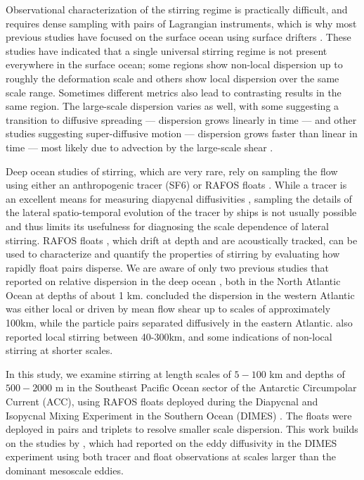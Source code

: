 \documentclass[]{ametsoc}
\begin{document}
Observational characterization of the stirring regime is practically difficult, and requires dense sampling with pairs of Lagrangian instruments, which is why most previous studies have focused on the surface ocean using surface drifters \citep{lacasce2003relative, koszalka2009relative, lumpkin2010surface, poje2014submesoscale, van2015pairwise, sanson2015surface, vera2016, Corrado2017, essink2019can}. These studies have indicated that a single universal stirring regime is not present everywhere in the surface ocean; some regions show non-local dispersion up to roughly the deformation scale and others show local dispersion over the same scale range. Sometimes different metrics also lead to contrasting results in the same region. The large-scale dispersion varies as well, with some suggesting a transition to diffusive spreading --- dispersion grows linearly in time --- \cite[e.g][]{koszalka2009relative} and other studies suggesting super-diffusive motion --- dispersion grows faster than linear in time --- most likely due to advection by the large-scale shear \cite[e.g][]{lacasce2003relative}. 

Deep ocean studies of stirring, which are very rare, rely on sampling the flow using either an anthropogenic tracer (SF6) \citep{ledwell1998mixing,watson2013rapid} or RAFOS floats \citep{rossby1986rafos}. While a tracer is an excellent means for measuring diapycnal diffusivities \citep{ledwell2000evidence,watson2013rapid, ledwell2016dispersion}, sampling the details of the lateral spatio-temporal evolution of the tracer by ships is not usually possible and thus limits its usefulness for diagnosing the scale dependence of lateral stirring. RAFOS floats \citep{swift1994rafos}, which drift at depth and are acoustically tracked, can be used to characterize and quantify the properties of stirring by evaluating how rapidly float pairs disperse. We are aware of only two previous studies that reported on relative dispersion in the deep ocean \citep{lacasce2000relative, ollitrault2005open}, both in the North Atlantic Ocean at depths of about 1 km. \citet{lacasce2000relative} concluded the dispersion in the western Atlantic was either local or driven by mean flow shear up to scales of approximately 100km, while the particle pairs separated diffusively in the eastern Atlantic. \citet{ollitrault2005open} also reported local stirring between 40-300km, and some indications of non-local stirring at shorter scales. 

In this study, we examine stirring at length scales of $5-100$ km and depths of $500-2000$ m in the Southeast Pacific Ocean sector of the Antarctic Circumpolar Current (ACC), using RAFOS floats deployed during the Diapycnal and Isopycnal Mixing Experiment in the Southern Ocean (DIMES) \citep{balwada2016}. The floats were deployed in pairs and triplets to resolve smaller scale dispersion. This work builds on the studies by \citet{tulloch2014direct, lacasce2014, balwada2016}, which had reported on the eddy diffusivity in the DIMES experiment using both tracer and float observations at scales larger than the dominant mesoscale eddies. 
\end{document}
